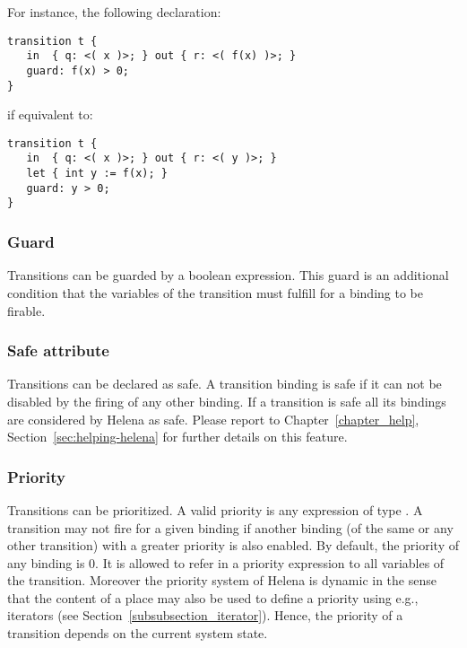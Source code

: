 For instance, the following declaration:
\begin{lstlisting}
transition t {
   in  { q: <( x )>; } out { r: <( f(x) )>; }
   guard: f(x) > 0;
}
\end{lstlisting}
if equivalent to:
\begin{lstlisting}
transition t {
   in  { q: <( x )>; } out { r: <( y )>; }
   let { int y := f(x); }
   guard: y > 0;
}
\end{lstlisting}

\boundvariablesdef


\subsubsection{Guard}
Transitions can be guarded by a boolean expression.  This guard is an
additional condition that the variables of the transition must fulfill
for a binding to be firable.\\

\guarddef


\subsubsection{Safe attribute}
Transitions can be declared as safe.  A transition binding is safe if
it can not be disabled by the firing of any other binding.  If a
transition is safe all its bindings are considered by Helena as safe.
Please report to Chapter~\ref{chapter_help},
Section~\ref{sec:helping-helena} for further details on this
feature.\\

\safedef


\subsubsection{Priority}
Transitions can be prioritized.  A valid priority is any expression of
type .  A transition may not fire for a given binding if
another binding (of the same or any other transition) with a greater
priority is also enabled.  By default, the priority of any binding is
0.  It is allowed to refer in a priority expression to all variables
of the transition.  Moreover the priority system of Helena is dynamic
in the sense that the content of a place may also be used to define a
priority using e.g., iterators (see
Section~\ref{subsubsection_iterator}).  Hence, the priority of a
transition depends on the current system state.

